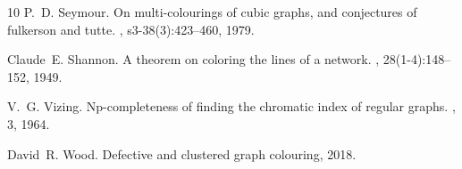 \documentclass[11pt]{article}
\begin{document}
\begin{thebibliography}{10}
P.~D. Seymour.
\newblock On multi-colourings of cubic graphs, and conjectures of fulkerson and
  tutte.
,
  s3-38(3):423--460, 1979.

Claude~E. Shannon.
\newblock A theorem on coloring the lines of a network.
, 28(1-4):148--152, 1949.

V.~G. Vizing.
\newblock Np-completeness of finding the chromatic index of regular graphs.
, 3, 1964.

David~R. Wood.
\newblock Defective and clustered graph colouring, 2018.

\end{thebibliography}
\end{document}
